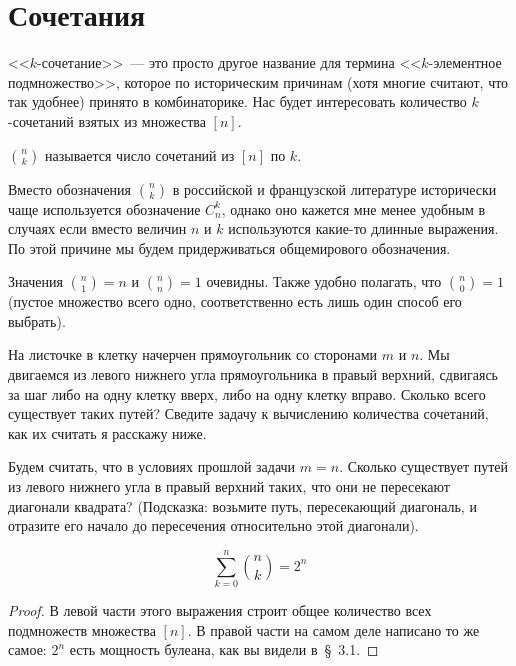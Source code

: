 \section{Сочетания}

<<$k$-сочетание>>~--- это просто другое название для термина <<$k$-элементное подмножество>>, которое по историческим причинам (хотя многие считают, что так удобнее) принято в комбинаторике. Нас будет интересовать количество $k$-сочетаний взятых из множества $[n]$.

\begin{definition}
 $n \choose k$ называется число сочетаний из $[n]$ по $k$.
\end{definition}

Вместо обозначения ${n \choose k}$ в российской и французской литературе исторически чаще используется обозначение $C^k_n$, однако оно кажется мне менее удобным в случаях если вместо величин $n$ и $k$ используются какие-то длинные выражения. По этой причине мы будем придерживаться общемирового обозначения.

Значения ${n \choose 1} = n$ и ${n \choose n} = 1$ очевидны. Также удобно полагать, что ${n \choose 0} =1$ (пустое множество всего одно, соответственно есть лишь один способ его выбрать). 

\begin{exercise}
На листочке в клетку начерчен прямоугольник со сторонами $m$ и $n$. Мы двигаемся из левого нижнего угла прямоугольника в правый верхний, сдвигаясь за шаг либо на одну клетку вверх, либо на одну клетку вправо. Сколько всего существует таких путей? Сведите задачу к вычислению количества сочетаний, как их считать я расскажу ниже.
\end{exercise}

\begin{exercise}
Будем считать, что в условиях прошлой задачи $m=n$. Сколько существует путей из левого нижнего угла в правый верхний таких, что они не пересекают диагонали квадрата? (Подсказка: возьмите путь, пересекающий диагональ, и отразите его начало до пересечения относительно этой диагонали).
\end{exercise}

\begin{thm}
$$\sum_{k=0}^n{n \choose k} = 2^n$$
\end{thm}
\begin{proof}
В левой части этого выражения строит общее количество всех подмножеств множества $[n]$. В правой части на самом деле написано то же самое: $2^n$ есть мощность булеана, как вы видели в~\S~3.1.
\end{proof}

